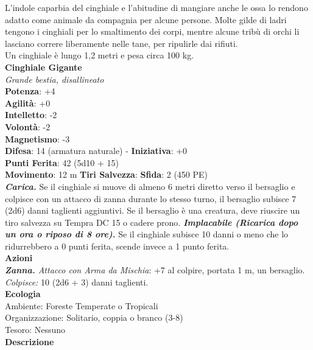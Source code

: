 \begin{multicols}{2}
L'indole caparbia del cinghiale e l'abitudine di mangiare anche le ossa lo rendono adatto come animale da compagnia per alcune persone. Molte gilde di ladri tengono i cinghiali per lo smaltimento dei corpi, mentre alcune tribù di orchi li lasciano correre liberamente nelle tane, per ripulirle dai rifiuti.\\

Un cinghiale è lungo 1,2 metri e pesa circa 100 kg.\\


\medskip\textbf{Cinghiale Gigante}\\
\emph{Grande bestia, disallineato}\\
\textbf{Potenza}: +4\\
\textbf{Agilità}: +0\\
\textbf{Intelletto}: -2\\
\textbf{Volontà}: -2\\
\textbf{Magnetismo}: -3\\
\textbf{Difesa}: 14 (armatura naturale) - \textbf{Iniziativa}: +0\\
\textbf{Punti Ferita}: 42 (5d10 + 15)\\
\textbf{Movimento}: 12 m
\textbf{Tiri Salvezza}:
\textbf{Sfida}: 2 (450 PE)\smallskip\\
\emph{\textbf{Carica.}} Se il cinghiale si muove di almeno 6 metri diretto verso il bersaglio e colpisce con un attacco di zanna durante lo stesso turno, il bersaglio subisce 7 (2d6) danni taglienti aggiuntivi. Se il bersaglio è una creatura, deve riuscire un tiro salvezza su Tempra DC  15 o cadere prono.
\emph{\textbf{Implacabile (Ricarica dopo un ora o riposo di 8 ore).}} Se il cinghiale subisce 10 danni o meno che lo ridurrebbero a 0 punti ferita, scende invece a 1 punto ferita.\\
\smallskip\textbf{Azioni}\\
\emph{\textbf{Zanna.} Attacco con Arma da Mischia}: +7 al colpire, portata 1 m, un bersaglio.\\
\emph{Colpisce:} 10 (2d6 + 3) danni taglienti.\\
\textbf{Ecologia}\\
Ambiente: Foreste Temperate o Tropicali\\
Organizzazione: Solitario, coppia o branco (3-8)\\
Tesoro: Nessuno\\
\textbf{Descrizione}\\


\end{multicols}
